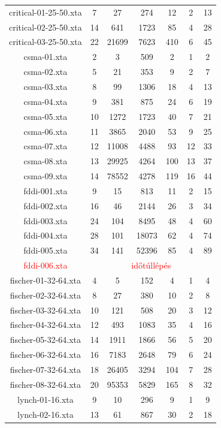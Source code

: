 \begin{table}
\begin{tabular}{ |c||c|c||c|c|c|c| }
 \hline
critical-01-25-50.xta & 7 & 27 & 274 & 12 & 2 & 13 \\
critical-02-25-50.xta & 14 & 641 & 1723 & 85 & 4 & 28 \\
critical-03-25-50.xta & 22 & 21699 & 7623 & 410 & 6 & 45 \\
\hline
csma-01.xta & 2 & 3 & 509 & 2 & 1 & 2 \\
csma-02.xta & 5 & 21 & 353 & 9 & 2 & 7 \\
csma-03.xta & 8 & 99 & 1306 & 18 & 4 & 13 \\
csma-04.xta & 9 & 381 & 875 & 24 & 6 & 19 \\
csma-05.xta & 10 & 1272 & 1723 & 40 & 7 & 21 \\
csma-06.xta & 11 & 3865 & 2040 & 53 & 9 & 25 \\
csma-07.xta & 12 & 11008 & 4488 & 93 & 12 & 33 \\
csma-08.xta & 13 & 29925 & 4264 & 100 & 13 & 37 \\
csma-09.xta & 14 & 78552 & 4278 & 119 & 16 & 44 \\
\hline
fddi-001.xta & 9 & 15 & 813 & 11 & 2 & 15 \\
fddi-002.xta & 16 & 46 & 2144 & 26 & 3 & 34 \\
fddi-003.xta & 24 & 104 & 8495 & 48 & 4 & 60 \\
fddi-004.xta & 28 & 101 & 18073 & 62 & 4 & 74 \\
fddi-005.xta & 34 & 141 & 52396 & 85 & 4 & 89 \\
\arrayrulecolor{red}\hdashline\arrayrulecolor{black}
\textcolor{red}{fddi-006.xta} & \multicolumn{6}{c|}{\textcolor{red}{időtúllépés}} \\
\hline
fischer-01-32-64.xta & 4 & 5 & 152 & 4 & 1 & 4 \\
fischer-02-32-64.xta & 8 & 27 & 380 & 10 & 2 & 8 \\
fischer-03-32-64.xta & 10 & 121 & 508 & 20 & 3 & 12 \\
fischer-04-32-64.xta & 12 & 493 & 1083 & 35 & 4 & 16 \\
fischer-05-32-64.xta & 14 & 1911 & 1866 & 56 & 5 & 20 \\
fischer-06-32-64.xta & 16 & 7183 & 2648 & 79 & 6 & 24 \\
fischer-07-32-64.xta & 18 & 26405 & 3294 & 104 & 7 & 28 \\
fischer-08-32-64.xta & 20 & 95353 & 5829 & 165 & 8 & 32 \\
\hline
lynch-01-16.xta & 9 & 10 & 296 & 9 & 1 & 9 \\
lynch-02-16.xta & 13 & 61 & 867 & 30 & 2 & 18 \\

\end{tabular}
\end{table}

